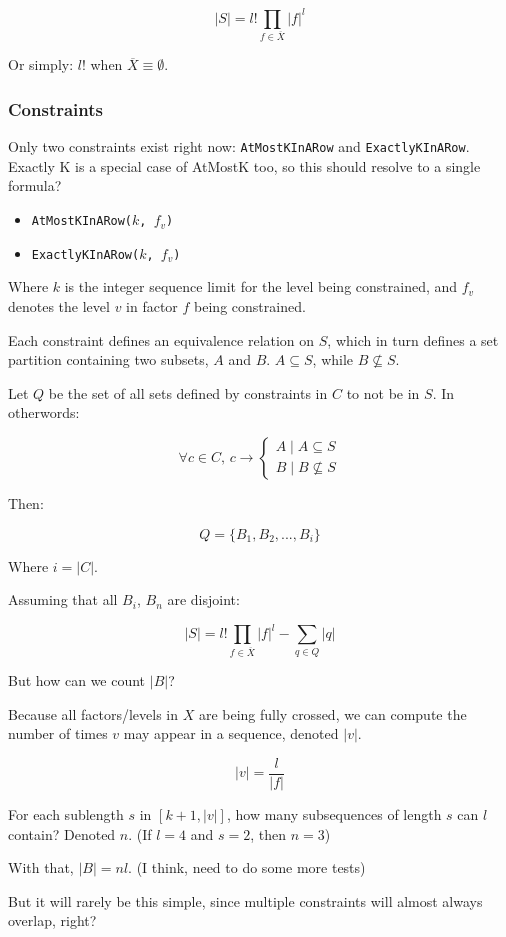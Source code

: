 \documentclass[a4paper]{article}
\begin{document}
\[
    |S|= {l!}  {\prod_{f \in \overline{X}} {|f|}^l}
\]

Or simply: $l!$ when $\overline{X} \equiv \emptyset$.

\subsubsection{Constraints}

Only two constraints exist right now: \texttt{AtMostKInARow} and \texttt{ExactlyKInARow}. Exactly K is a special case of AtMostK too, so this should resolve to a single formula?

\begin{itemize}
\item \texttt{AtMostKInARow($k$, $f_v$)}
\item \texttt{ExactlyKInARow($k$, $f_v$)}
\end{itemize}

Where $k$ is the integer sequence limit for the level being constrained, and $f_v$ denotes the level $v$ in factor $f$ being constrained.

Each constraint defines an equivalence relation on $S$, which in turn defines a set partition containing two subsets, $A$ and $B$. $A \subseteq S$, while $B \not\subseteq S$.

Let $Q$ be the set of all sets defined by constraints in $C$ to not be in $S$. In otherwords:

\[
    \forall c \in C \text{, } c \to \begin{cases}
      A \mid A \subseteq S\\
      B \mid B \not\subseteq S
    \end{cases}
\]


Then:

\[
    Q = \{{ B_1, B_2, ..., B_i\}}
\]

Where $i = |C|$.

Assuming that all $B_i$, $B_n$ are disjoint:

\[
    |S| = {l!} {\prod_{f \in \overline{X}} {|f|}^l} - \sum_{q \in Q} {|q|}
\]

But how can we count $|B|$?

Because all factors/levels in $X$ are being fully crossed, we can compute the number of times $v$ may appear in a sequence, denoted $|v|$.

\[
    |v| = \frac{l}{|f|}
\]

For each sublength $s$ in $[k+1, |v|]$, how many subsequences of length $s$ can $l$ contain? Denoted $n$. (If $l = 4$ and $s = 2$, then $n = 3$)

With that, $|B| = nl$. (I think, need to do some more tests)

But it will rarely be this simple, since multiple constraints will almost always overlap, right?
\end{document}
